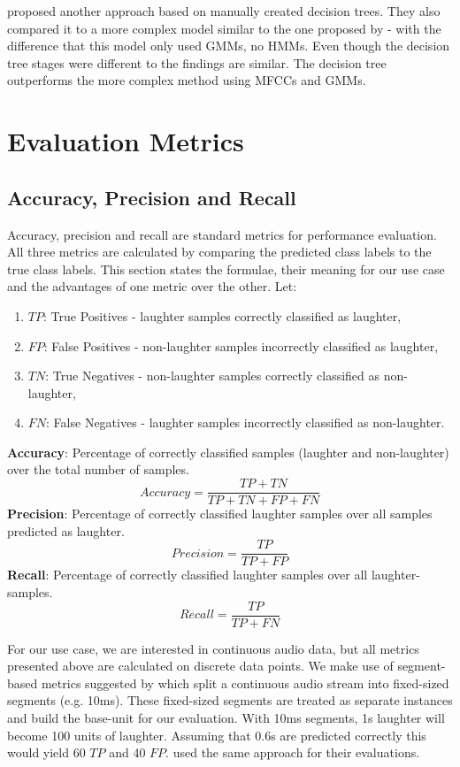 \documentclass[bsc,frontabs,parskip,deptreport]{infthesis}
\begin{document}
\citet {manoj2011novel} proposed another approach based on manually created decision trees. They also compared it to a more complex model similar to the one proposed by \citet{cai2003highlight} - with the difference that this model only used GMMs, no HMMs.
Even though the decision tree stages were different to \citet{li2009characteristics} the findings are similar. The decision tree outperforms the more complex method using MFCCs and GMMs.  

\section{Evaluation Metrics} \label{theory}
\subsection{Accuracy, Precision and Recall} \label{sec:acc-prec-rec}
Accuracy, precision and recall are standard metrics for performance evaluation.
All three metrics are calculated by comparing the predicted class labels to the true class labels.
This section states the formulae, their meaning for our use case and the advantages of one metric over the other.
Let:
\begin{enumerate}
    \item $TP$: True Positives - laughter samples correctly classified as laughter,
    \item $FP$: False Positives - non-laughter samples incorrectly classified as laughter,
    \item $TN$: True Negatives - non-laughter samples correctly classified as non-laughter,
    \item $FN$: False Negatives - laughter samples incorrectly classified as non-laughter.
\end{enumerate}
\textbf{Accuracy}: Percentage of correctly classified samples (laughter and non-laughter) over the total number of samples.
$$Accuracy = \frac{TP+TN}{TP+TN+FP+FN}$$
\textbf{Precision}: Percentage of correctly classified laughter samples over all samples predicted as laughter.
$$Precision = \frac{TP}{TP+FP}$$
\textbf{Recall}: Percentage of correctly classified laughter samples over all laughter-samples.
$$Recall = \frac{TP}{TP+FN}$$

For our use case, we are interested in continuous audio data, but all metrics presented above are calculated on discrete data points. We make use of segment-based metrics suggested by \citet{mesaros2016metrics} which split a continuous audio stream into fixed-sized segments (e.g. 10ms). These fixed-sized segments are treated as separate instances and build the base-unit for our evaluation. With 10ms segments, 1s laughter will become 100 units of laughter. Assuming that 0.6s are predicted correctly this would yield 60 $TP$ and 40 $FP$.
\citet{gillick2021robust} used the same approach for their evaluations.
\end{document}
